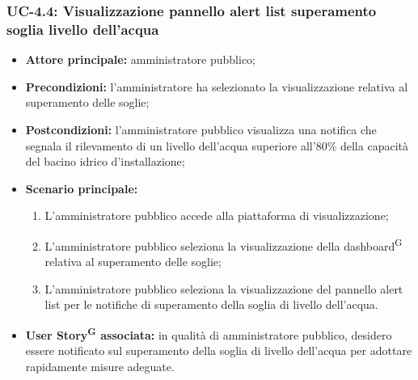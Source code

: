 \documentclass[8pt]{article}
\newcommand{\glossterm}[1]{#1\textsuperscript{G}} %
\begin{document}
\subsubsection*{UC-4.4: Visualizzazione pannello alert list superamento soglia livello dell'acqua}
\begin{itemize}
    \item \textbf{Attore principale:} amministratore pubblico;
    \item \textbf{Precondizioni:} l'amministratore ha selezionato la visualizzazione relativa al superamento delle soglie;
    \item \textbf{Postcondizioni:} l’amministratore pubblico visualizza una notifica che segnala il rilevamento di un livello dell'acqua superiore all'80\% della capacità del bacino idrico d'installazione;
    \item \textbf{Scenario principale:}
        \begin{enumerate}
        \item L’amministratore pubblico accede alla piattaforma di visualizzazione;
        \item L’amministratore pubblico seleziona la visualizzazione della \glossterm{dashboard} relativa al superamento delle soglie;
        \item L'amministratore pubblico seleziona la visualizzazione del pannello alert list per le notifiche di superamento della soglia di livello dell'acqua.
        \end{enumerate}
    \item \textbf{\glossterm{User Story} associata:} in qualità di amministratore pubblico, desidero essere notificato sul superamento della soglia di livello dell'acqua per adottare rapidamente misure adeguate.
\end{itemize}
\end{document}
